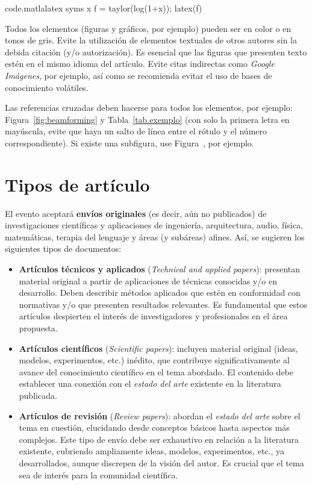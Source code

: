 \begin{matlabcode}{code.matlalatex}
  syms x
  f = taylor(log(1+x));
  latex(f)
\end{matlabcode}

Todos los elementos (figuras y gráficos, por ejemplo) pueden ser en color o en tonos de gris. Evite la utilización de elementos textuales de otros autores sin la debida citación (y/o autorización). Es esencial que las figuras que presenten texto estén en el mismo idioma del artículo. Evite citas indirectas como \textit{Google Imágenes}, por ejemplo, así como se recomienda evitar el uso de bases de conocimiento volátiles.

Las referencias cruzadas deben hacerse para todos los elementos, por ejemplo: Figura~\ref{fig:beamforming} y Tabla~\ref{tab.exemplo} (con solo la primera letra en mayúscula, evite que haya un salto de línea entre el rótulo y el número correspondiente). Si existe una subfigura, use Figura~, por ejemplo.

\section{Tipos de artículo}

El evento aceptará \textbf{envíos originales} (es decir, aún no publicados) de investigaciones científicas y aplicaciones de ingeniería, arquitectura, audio, física, matemáticas, terapia del lenguaje y áreas (y subáreas) afines. Así, se sugieren los siguientes tipos de documentos:
%
\begin{itemize}[topsep=0ex] \itemsep=2pt
	\item \textbf{Artículos técnicos y aplicados} (\textit{Technical and applied papers}):
	presentan material original a partir de aplicaciones de técnicas conocidas y/o en desarrollo. Deben describir métodos aplicados que estén en conformidad con normativas y/o que presenten resultados relevantes. Es fundamental que estos artículos despierten el interés de investigadores y profesionales en el área propuesta.
	
	\item \textbf{Artículos científicos} (\textit{Scientific papers}): 
	incluyen material original (ideas, modelos, experimentos, etc.) inédito, que contribuye significativamente al avance del conocimiento científico en el tema abordado. El contenido debe establecer una conexión con el \textit{estado del arte} existente en la literatura publicada.

	\item \textbf{Artículos de revisión} (\textit{Review papers}):
	abordan el \textit{estado del arte} sobre el tema en cuestión, elucidando desde conceptos básicos hasta aspectos más complejos. Este tipo de envío debe ser exhaustivo en relación a la literatura existente, cubriendo ampliamente ideas, modelos, experimentos, etc., ya desarrollados, aunque discrepen de la visión del autor. Es crucial que el tema sea de interés para la comunidad científica.
\end{itemize}

